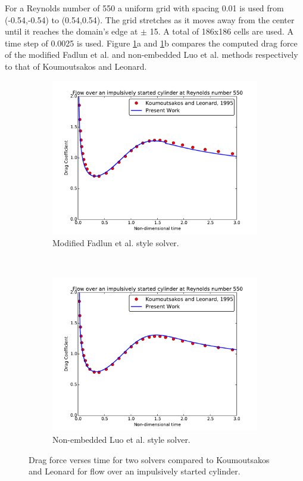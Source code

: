 \documentclass[onehalf,11pt]{beavtex}
\begin{document}
For a Reynolds number of 550 a uniform grid with spacing 0.01 is used from (-0.54,-0.54) to (0.54,0.54).
The grid stretches as it moves away from the center until it reaches the domain's edge at $\pm$ 15.
A total of 186x186 cells are used.
A time step of 0.0025 is used.
Figure \ref{fig:cy550}a and \ref{fig:cy550}b compares the computed drag force of the modified Fadlun et al. and non-embedded Luo et al. methods respectively to that of Koumoutsakos and Leonard.
\begin{figure}[h]
	\centering
	\begin{subfigure}{0.4\textwidth}
		\includegraphics[width=\linewidth]{cy550fadlun}
		\caption{Modified Fadlun et al. style solver.}
	\end{subfigure}
	~
	\begin{subfigure}{0.4\textwidth}
		\includegraphics[width=\linewidth]{cy550luo}
		\caption{Non-embedded Luo et al. style solver.}
	\end{subfigure}
	\caption{Drag force verses time for two solvers compared to Koumoutsakos and Leonard for flow over an impulsively started cylinder.}
	\label{fig:cy550}
\end{figure}
\end{document}
